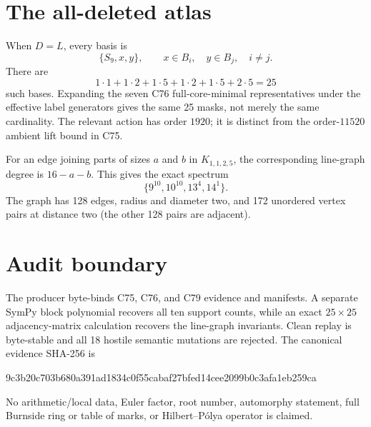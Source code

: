 \documentclass[10pt]{article}
\begin{document}
\section{The all-deleted atlas}
When $D=L$, every basis is
\[
 \{S_9,x,y\},\qquad x\in B_i,\quad y\in B_j,\quad i\ne j.
\]
There are
\[
 1\cdot1+1\cdot2+1\cdot5+1\cdot2+1\cdot5+2\cdot5=25
\]
such bases.  Expanding the seven C76 full-core-minimal representatives under
the effective label generators gives the same 25 masks, not merely the same
cardinality.  The relevant action has order $1920$; it is distinct from the
order-$11520$ ambient lift bound in C75.

For an edge joining parts of sizes $a$ and $b$ in $K_{1,1,2,5}$, the
corresponding line-graph degree is $16-a-b$.  This gives the exact spectrum
\[
 \{9^{10},10^{10},13^4,14^1\}.
\]
The graph has 128 edges, radius and diameter two, and 172 unordered vertex
pairs at distance two (the other 128 pairs are adjacent).

\section{Audit boundary}
The producer byte-binds C75, C76, and C79 evidence and manifests.  A separate
SymPy block polynomial recovers all ten support counts, while an exact
$25\times25$ adjacency-matrix calculation recovers the line-graph invariants.
Clean replay is byte-stable and all 18 hostile semantic mutations are
rejected.  The canonical evidence SHA-256 is
\begin{center}
\small\ttfamily
9c3b20c703b680a391ad1834c0f55cabaf27bfed14cee2099b0c3afa1eb259ca
\end{center}
No arithmetic/local data, Euler factor, root number, automorphy statement,
full Burnside ring or table of marks, or Hilbert--P\'olya operator is claimed.
\end{document}
